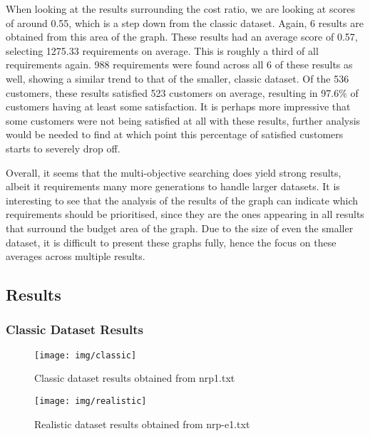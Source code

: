 \documentclass[11pt, a4paper]{article}
\begin{document}
When looking at the results surrounding the cost ratio, we are looking at scores
of around 0.55, which is a step down from the classic dataset. Again, 6 results
are obtained from this area of the graph. These results had an average score of
0.57, selecting 1275.33 requirements on average. This is roughly a third of all
requirements again. 988 requirements were found across all 6 of these results
as well, showing a similar trend to that of the smaller, classic dataset. Of the
536 customers, these results satisfied 523 customers on average, resulting in
97.6\% of customers having at least some satisfaction. It is perhaps more
impressive that some customers were not being satisfied at all with these
results, further analysis would be needed to find at which point this percentage
of satisfied customers starts to severely drop off.

Overall, it seems that the multi-objective searching does yield strong results,
albeit it requirements many more generations to handle larger datasets. It is
interesting to see that the analysis of the results of the graph can indicate
which requirements should be prioritised, since they are the ones appearing in
all results that surround the budget area of the graph. Due to the size of even
the smaller dataset, it is difficult to present these graphs fully, hence the
focus on these averages across multiple results.

\newpage
\subsection{Results} %
\label{sub:results}
\subsubsection{Classic Dataset Results} %
\label{ssub:classic_dataset_results}
\begin{figure}[H]
    \centering
    \texttt{[image: img/classic]}
    \caption{Classic dataset results obtained from nrp1.txt}
    \label{fig:classic}
\end{figure}

\begin{figure}[H]
    \centering
    \texttt{[image: img/realistic]}
    \caption{Realistic dataset results obtained from nrp-e1.txt}
    \label{fig:realistic}
\end{figure}
\end{document}
